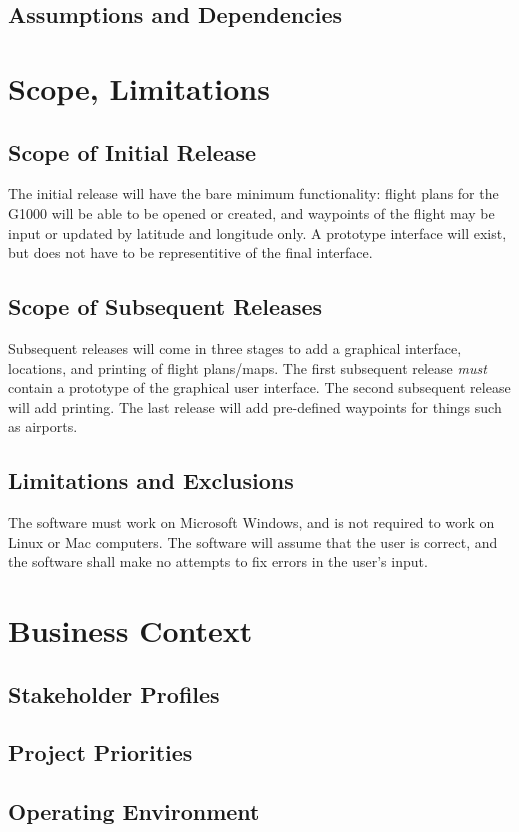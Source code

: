 \documentclass[12pt, letterpaper]{article}
\begin{document}
\subsection{Assumptions and Dependencies}

\section{Scope, Limitations}
\subsection{Scope of Initial Release}
The initial release will have the bare minimum functionality:
    flight plans for the G1000 will be able to be opened or created,
    and waypoints of the flight may be input or updated by latitude and longitude only.
A prototype interface will exist, but does not have to be representitive of the final interface.

\subsection{Scope of Subsequent Releases}
Subsequent releases will come in three stages to add a graphical interface, locations, and printing of flight plans/maps.
The first subsequent release \emph{must} contain a prototype of the graphical user interface.
The second subsequent release will add printing.
The last release will add pre-defined waypoints for things such as airports.

\subsection{Limitations and Exclusions}
The software must work on Microsoft Windows, and is not required to work on Linux or Mac computers.
The software will assume that the user is correct,
    and the software shall make no attempts to fix errors in the user's input.

\section{Business Context}
\subsection{Stakeholder Profiles}
\subsection{Project Priorities}
\subsection{Operating Environment}

{}

\end{document}
